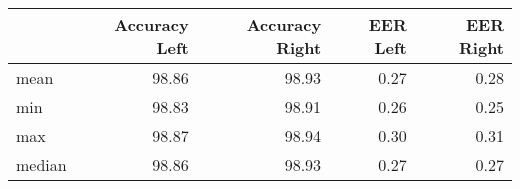 \begin{tabular}{lrrrr}
\toprule
{} &  Accuracy Left &  Accuracy Right &  EER Left &  EER Right \\
\midrule
mean   &          98.86 &           98.93 &      0.27 &       0.28 \\
min    &          98.83 &           98.91 &      0.26 &       0.25 \\
max    &          98.87 &           98.94 &      0.30 &       0.31 \\
median &          98.86 &           98.93 &      0.27 &       0.27 \\
\bottomrule
\end{tabular}
